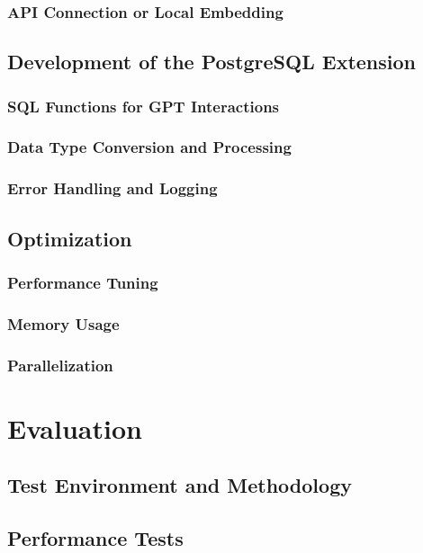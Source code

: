 \documentclass{article}
\begin{document}
\subsubsection{API Connection or Local Embedding}

\subsection{Development of the PostgreSQL Extension}
\subsubsection{SQL Functions for GPT Interactions}
\subsubsection{Data Type Conversion and Processing}
\subsubsection{Error Handling and Logging}

\subsection{Optimization}
\subsubsection{Performance Tuning}
\subsubsection{Memory Usage}
\subsubsection{Parallelization}

\newpage

\section{Evaluation}

\subsection{Test Environment and Methodology}

\subsection{Performance Tests}
\end{document}
